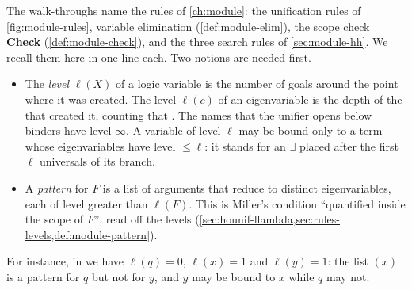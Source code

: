 The walk-throughs name the rules of \cref{ch:module}: the unification rules of
\cref{fig:module-rules}, variable elimination (\cref{def:module-elim}), the scope check
\textbf{Check} (\cref{def:module-check}), and the three search rules of \cref{sec:module-hh}. We recall
them here in one line each. Two notions are needed first.
\begin{itemize}
  \item The \emph{level} $\ell(X)$ of a logic variable is the number of  goals around the point
    where it was created. The level $\ell(c)$ of an eigenvariable is the depth of the  that
    created it, counting that . The names that the unifier opens below binders have level
    $\infty$. A variable of level $\ell$ may be bound only to a term whose eigenvariables have level
    $\le\ell$: it stands for an $\exists$ placed after the first $\ell$ universals of its branch.
  \item A \emph{pattern} for $F$ is a list of arguments that reduce to distinct eigenvariables, each of
    level greater than $\ell(F)$. This is Miller's condition \enquote{quantified inside the scope of
    $F$}, read off the levels (\cref{sec:hounif-llambda,sec:rules-levels,def:module-pattern}).
\end{itemize}
For instance, in  we have $\ell(q)=0$, $\ell(x)=1$ and
$\ell(y)=1$: the list $(x)$ is a pattern for $q$ but not for $y$, and $y$ may be bound to $x$ while $q$
may not.

